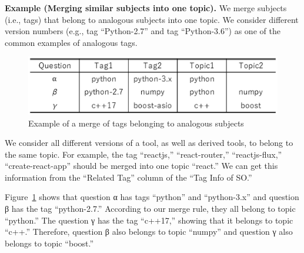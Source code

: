 \documentclass[conference]{IEEEtran}
\begin{document}
\noindent
\textbf{Example (Merging similar subjects into one topic).}
We merge subjects (i.e., tags) that belong to analogous subjects into one topic. We consider different version numbers (e.g., tag ``Python-2.7'' and tag ``Python-3.6'') as one of the common examples of analogous tags. 

\begin{figure}[t]
 \centering
 \includegraphics[width=1.0\hsize]{img/ff2.eps}  
 \caption{Example of a merge of tags belonging to analogous subjects} 
 \label{fig:example2} 
\end{figure}

We consider all different versions of a tool, as well as derived tools, to belong to the same topic. For example, the tag ``reactjs,'' ``react-router,'' ``reactjs-flux,'' ``create-react-app'' should be merged into one topic ``react.'' We can get this information from the “Related Tag” column of the ``Tag Info of SO.''

Figure~\ref{fig:example2} shows that question α has tags ``python'' and ``python-3.x'' and question β has the tag ``python-2.7.'' According to our merge rule, they all belong to topic ``python.'' The question γ has the tag ``c++17,'' showing that it belongs to topic ``c++.'' Therefore, question β also belongs to topic ``numpy'' and question γ also belongs to topic ``boost.''
\end{document}
